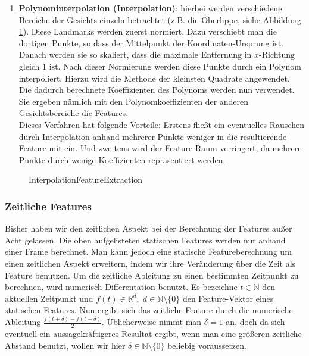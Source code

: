 \begin{enumerate}
      \item \textbf{Polynominterpolation (Interpolation)}: 
     hierbei werden verschiedene Bereiche der Gesichts einzeln betrachtet (z.B. die Oberlippe, siehe Abbildung \ref{fig:interpol}).
     Diese Landmarks werden zuerst normiert. Dazu verschiebt man die dortigen Punkte, so dass der Mittelpunkt der Koordinaten-Ursprung ist. Danach werden sie so skaliert, dass die maximale Entfernung in $x$-Richtung gleich $1$ ist.
     Nach dieser Normierung werden diese Punkte durch ein Polynom interpoliert. Hierzu wird die Methode der kleinsten Quadrate angewendet. Die dadurch berechnete Koeffizienten des Polynoms werden nun verwendet. Sie ergeben nämlich mit den Polynomkoeffizienten der anderen Gesichtsbereiche die Features.\\
     Dieses Verfahren hat folgende Vorteile: 
     Erstens fließt ein eventuelles Rauschen durch Interpolation anhand mehrerer Punkte  weniger in die resultierende Feature mit ein. Und zweitens wird der Feature-Raum verringert, da mehrere Punkte durch wenige Koeffizienten repräsentiert werden.
\end{enumerate}
\begin{figure}
\scalebox{ 0.9 }{

}
\caption{InterpolationFeatureExtraction}
\label{fig:interpol}
\end{figure}

\subsubsection{Zeitliche Features}
Bisher haben wir den zeitlichen Aspekt bei der Berechnung der Features außer Acht gelassen. Die oben aufgelisteten statischen Features werden nur anhand einer Frame berechnet.
Man kann jedoch eine statische Featureberechnung um einen zeitlichen Aspekt erweitern, indem wir ihre Veränderung über die Zeit als Feature benutzen. 
Um die zeitliche Ableitung zu einen bestimmten Zeitpunkt zu berechnen, wird
numerisch Differentation benutzt. Es bezeichne $t\in\mathbb{N}$ den aktuellen Zeitpunkt und $f(t)\in\mathbb{R}^d,\;d\in\mathbb{N}\setminus\{0\}$ den Feature-Vektor eines statischen Features. Nun ergibt sich das zeitliche Feature durch die numerische Ableitung $\frac{f(t+\delta)-f(t-\delta)}{2}$. Üblicherweise nimmt man $\delta=1$ an, doch da sich eventuell ein aussagekräftigeres Resultat ergibt, wenn man eine größeren zeitliche Abstand benutzt, wollen wir hier $\delta\in\mathbb{N}\setminus\{0\}$  beliebig voraussetzen.

